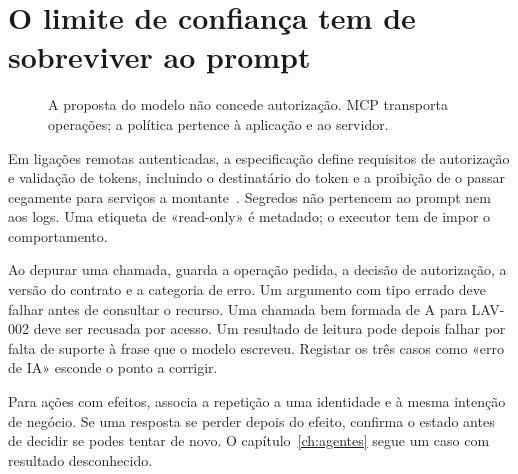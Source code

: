 \section{O limite de confiança tem de sobreviver ao prompt}
\begin{figure}[htbp]
\centering
{}
\caption{A proposta do modelo não concede autorização. MCP transporta operações; a política pertence à aplicação e ao servidor.}
\label{fig:ferramentas}
\end{figure}

Em ligações remotas autenticadas, a especificação define requisitos de autorização e validação de tokens, incluindo o destinatário do token e a proibição de o passar cegamente para serviços a montante~\citep{mcpauth2026}. Segredos não pertencem ao prompt nem aos logs. Uma etiqueta de «read-only» é metadado; o executor tem de impor o comportamento.

Ao depurar uma chamada, guarda a operação pedida, a decisão de autorização, a versão do contrato e a categoria de erro. Um argumento com tipo errado deve falhar antes de consultar o recurso. Uma chamada bem formada de A para LAV-002 deve ser recusada por acesso. Um resultado de leitura pode depois falhar por falta de suporte à frase que o modelo escreveu. Registar os três casos como «erro de IA» esconde o ponto a corrigir.

Para ações com efeitos, associa a repetição a uma identidade e à mesma intenção de negócio. Se uma resposta se perder depois do efeito, confirma o estado antes de decidir se podes tentar de novo. O capítulo~\ref{ch:agentes} segue um caso com resultado desconhecido.

